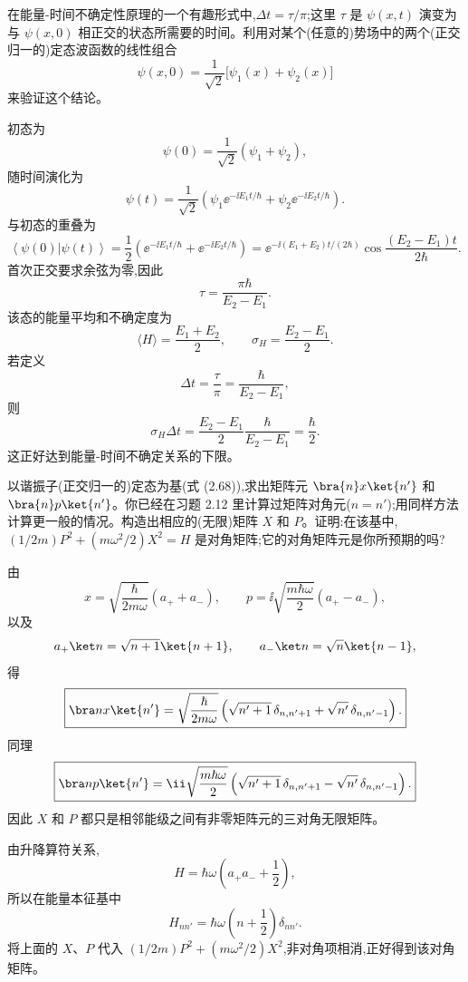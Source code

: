 \begin{question}
在能量-时间不确定性原理的一个有趣形式中,$\Delta t=\tau/\pi$;这里 $\tau$ 是 $\psi(x,t)$ 演变为与 $\psi(x,0)$ 相正交的状态所需要的时间。利用对某个(任意的)势场中的两个(正交归一的)定态波函数的线性组合
\[
\psi(x,0)=\frac{1}{\sqrt2}\bigl[\psi_1(x)+\psi_2(x)\bigr]
\]
来验证这个结论。
\end{question}
\begin{solution}
初态为
\[
\psi(0)=\frac1{\sqrt2}(\psi_1+\psi_2),
\]
随时间演化为
\[
\psi(t)=\frac1{\sqrt2}\left(\psi_1\ee^{-\ii E_1t/\hbar}
+\psi_2\ee^{-\ii E_2t/\hbar}\right).
\]
与初态的重叠为
\[
\left\langle \psi(0)|\psi(t) \right\rangle
=\frac12\left(\ee^{-\ii E_1t/\hbar}+\ee^{-\ii E_2t/\hbar}\right)
=\ee^{-\ii(E_1+E_2)t/(2\hbar)}
\cos\frac{(E_2-E_1)t}{2\hbar}.
\]
首次正交要求余弦为零,因此
\[
\tau=\frac{\pi\hbar}{E_2-E_1}.
\]
该态的能量平均和不确定度为
\[
\langle H\rangle=\frac{E_1+E_2}{2},
\qquad
\sigma_H=\frac{E_2-E_1}{2}.
\]
若定义
\[
\Delta t=\frac\tau\pi=\frac{\hbar}{E_2-E_1},
\]
则
\[
\sigma_H\Delta t=\frac{E_2-E_1}{2}\frac{\hbar}{E_2-E_1}=\frac\hbar2.
\]
这正好达到能量-时间不确定关系的下限。
\end{solution}

\begin{question}
以谐振子(正交归一的)定态为基(式 (2.68)),求出矩阵元 $\bra{n}x\ket{n'}$ 和 $\bra{n}p\ket{n'}$。你已经在习题 2.12 里计算过矩阵对角元($n=n'$);用同样方法计算更一般的情况。构造出相应的(无限)矩阵 $X$ 和 $P$。证明:在该基中,$(1/2m)P^2+(m\omega^2/2)X^2=H$ 是对角矩阵;它的对角矩阵元是你所预期的吗?

\par\smallskip
{}

\end{question}
\begin{solution}
由
\[
x=\sqrt{\frac{\hbar}{2m\omega}}(a_++a_-),
\qquad
p=\ii\sqrt{\frac{m\hbar\omega}{2}}(a_+-a_-),
\]
以及
\[
a_+\ket n=\sqrt{n+1}\ket{n+1},
\qquad
a_-\ket n=\sqrt n\ket{n-1},
\]
得
\[
\boxed{\bra n x\ket{n'}=\sqrt{\frac{\hbar}{2m\omega}}
\left(\sqrt{n'+1}\,\delta_{n,n'+1}+\sqrt{n'}\,\delta_{n,n'-1}\right).}
\]
同理
\[
\boxed{\bra n p\ket{n'}=\ii\sqrt{\frac{m\hbar\omega}{2}}
\left(\sqrt{n'+1}\,\delta_{n,n'+1}-\sqrt{n'}\,\delta_{n,n'-1}\right).}
\]
因此 $X$ 和 $P$ 都只是相邻能级之间有非零矩阵元的三对角无限矩阵。

由升降算符关系,
\[
H=\hbar\omega\left(a_+a_-+\frac12\right),
\]
所以在能量本征基中
\[
\boxed{H_{nn'}=\hbar\omega\left(n+\frac12\right)\delta_{nn'}.}
\]
将上面的 $X$、$P$ 代入 $(1/2m)P^2+(m\omega^2/2)X^2$,非对角项相消,正好得到该对角矩阵。
\end{solution}

